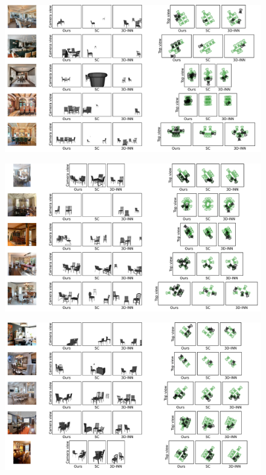 \begin{figure}
    \includegraphics[width=\textwidth]{figures/qualitative_results/full/qual_results_12.pdf}
\end{figure}
\begin{figure}
    \includegraphics[width=\textwidth]{figures/qualitative_results/full/qual_results_13.pdf}
\end{figure}
\begin{figure}
    \includegraphics[width=\textwidth]{figures/qualitative_results/full/qual_results_14.pdf}
\end{figure}
